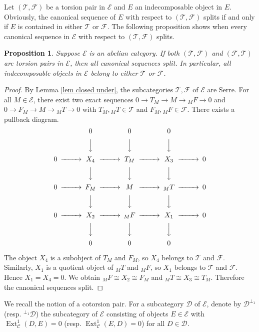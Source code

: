 \documentclass{amsart}
\newtheorem{prop}[thm]{Proposition}
\theoremstyle{definition}
\theoremstyle{remark}
\def\C{\mathcal{C}}
\def\D{\mathcal{D}}
\def\E{\mathcal{E}}
\def\Ext{\operatorname{Ext}}
\def\F{\mathcal{F}}
\def\T{\mathcal{T}}
\begin{document}
Let $(\T,\F)$ be a torsion pair in $\E$ and $E$ an indecomposable object in $E$. Obviously, the canonical sequence of $E$ with respect to $(\T,\F)$ splits if and only if $E$ is contained in either $\T$ or $\F$. The following proposition shows when every canonical sequence in $\E$ with respect to $(\T,\F)$ splits.

\begin{prop}\label{prop cano seq split}
Suppose $\E$ is an abelian category. If both $(\T,\F)$ and $(\F,\T)$ are torsion pairs in $\E$, then all canonical sequences split. In particular, all indecomposable objects in $\E$ belong to either $\T$ or $\F$.
\end{prop}

\begin{proof}
By Lemma \ref{lem closed under}, the subcategories $\T,\F$ of $\E$ are Serre. For all $M \in \E$, there exist two exact sequences $0 \to T_M \to M \to {}_MF \to 0$ and $0\to F_M \to M \to {}_MT\to 0$ with $T_M,{}_MT \in \T$ and $F_M,{}_MF \in \F$. There exists a pullback diagram.
$$
\begin{CD}
 @. 0 @. 0 @. 0 @.\\
@. @VVV @VVV @VVV @.\\
0 @>>> X_4 @>>> T_M @>>> X_3 @>>> 0\\
@. @VVV @VVV @VVV @.\\
0 @>>> F_M @>>> M @>>> {}_MT @>>> 0\\
@. @VVV @VVV @VVV @.\\
0 @>>> X_2 @>>> {}_MF @>>> X_1 @>>> 0\\
@. @VVV @VVV @VVV @.\\
 @. 0 @. 0 @. 0 @.
\end{CD}
$$

The object $X_4$ is a subobject of $T_M$ and $F_M$, so $X_4$ belongs to $\T$ and $\F$. Similarly, $X_1$ is a quotient object of ${}_MT$ and ${}_MF$, so $X_1$ belongs to $\T$ and $\F$. Hence $X_1=X_4=0$. We obtain ${}_MF \cong X_2 \cong F_M$ and ${}_MT \cong X_3 \cong T_M$. Therefore the canonical sequences split. 
\end{proof}

We recall the notion of a cotorsion pair. For a subcategory $\D$ of $\E$, denote by $\D^{\perp_1}$ (resp. $^{\perp_1}\D$) the subcategory of $\E$ consisting of objects $E\in\E$ with $\Ext^1_\C(D,E)=0$ (resp. $\Ext^1_\C(E,D)=0$) for all $D\in\D$.
\end{document}
